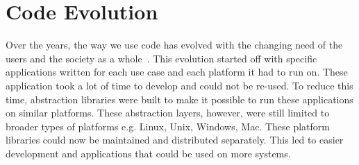 %
%
%

\section{Code Evolution}
Over the years, the way we use code has evolved with the changing need of the users and the society as a whole~\cite{rajlich2014software}. This evolution started off with specific applications written for each use case and each platform it had to run on. These application took a lot of time to develop and could not be re-used. To reduce this time, abstraction libraries were built to make it possible to run these applications on similar platforms. These abstraction layers, however, were still limited to broader types of platforms e.g. Linux, Unix, Windows, Mac. These platform libraries could now be maintained and distributed separately. This led to easier development and applications that could be used on more systems.

